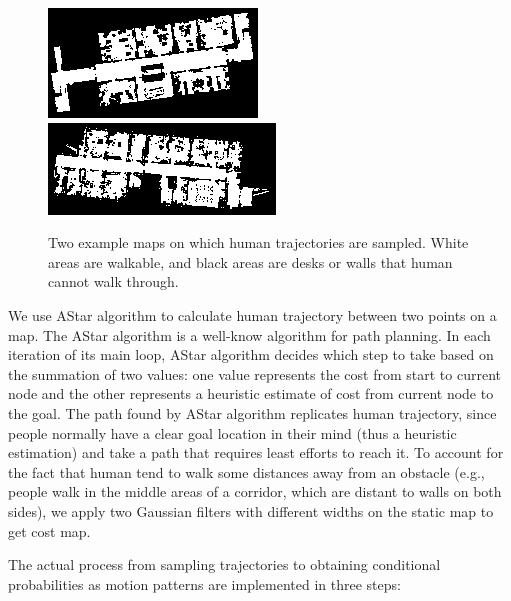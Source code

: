 \begin{figure}[ht]
  \centering
    \includegraphics[width=.8\textwidth, height=.3\textwidth]{figures/map1.png}
    \includegraphics[width=.8\textwidth, height=.3\textwidth]{figures/map2.png}
    \caption[Two example maps on which human trajectories are sampled from.]{Two example maps on which human trajectories are sampled. White areas are walkable, and black areas are desks or walls that human cannot walk through.}
    \label{fig:maps}
\end{figure} 

We use AStar algorithm to calculate human trajectory between two points on a map. The AStar algorithm is a well-know algorithm for path planning. In each iteration of its main loop, AStar algorithm decides which step to take based on the summation of two values: one value represents the cost from start to current node and the other represents a heuristic estimate of cost from current node to the goal. The path found by AStar algorithm replicates human trajectory, since people normally have a clear goal location in their mind (thus a heuristic estimation) and take a path that requires least efforts to reach it. To account for the fact that human tend to walk some distances away from an obstacle (e.g., people walk in the middle areas of a corridor, which are distant to walls on both sides), we apply two Gaussian filters with different widths on the static map to get cost map.  

The actual process from sampling trajectories to obtaining conditional probabilities as motion patterns are implemented in three steps:

